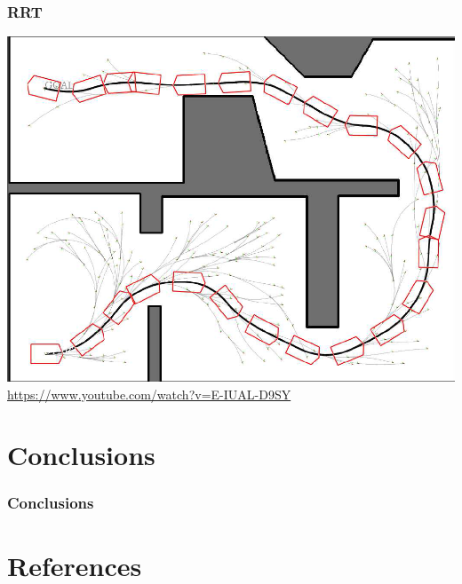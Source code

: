 \documentclass{beamer}
\begin{document}
\begin{frame}
\frametitle{RRT}

\centering
 \includegraphics[width=.55\textwidth]{figures/rrt.png}\\
\href{url}{https://www.youtube.com/watch?v=E-IUAL-D9SY}

\end{frame}



\section{Conclusions}
\begin{frame}
\frametitle{Conclusions}

\end{frame}

\section{References}
\end{document}
